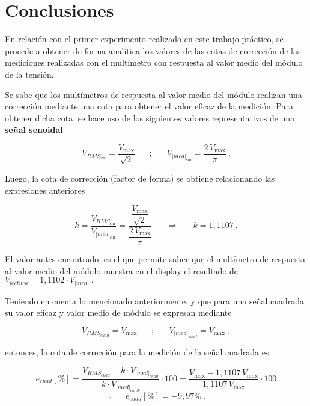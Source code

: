   \pagebreak
  \section{Conclusiones}
    En relación con el primer experimento realizado en este trabajo
    práctico, se procede a obtener de forma analítica los valores
    de las cotas de corrección de las mediciones realizadas con
    el multímetro con respuesta al valor medio del módulo de la 
    tensión.
    
    Se sabe que los multímetros de respuesta al valor medio del
    módulo realizan una corrección mediante una cota para obtener 
    el valor eficaz de la medición. Para obtener dicha cota, se 
    hace uso de los siguientes valores representativos de una 
    \textbf{señal senoidal}

    \vspace{-5pt}
    $$ V_{RMS_{\sin}} = \dfrac{V_{\max}}{\sqrt{2}} \hspace{20pt} ; 
    \hspace{20pt} V_{|med|_{\sin}} = \dfrac{2\, V_{\max}}{\pi}~. $$

    \noindent Luego, la cota de corrección (factor de forma) se obtiene
    relacionando las expresiones anteriores
    
    \vspace{-5pt}
     $$ k = \dfrac{V_{RMS_{\sin}}}{V_{|med|_{\sin}}} 
        = \dfrac{\dfrac{V_{\max}}{\sqrt{2}}}{\dfrac{2\, V_{\max}}{\pi}}
        \hspace{20pt} \Longrightarrow \hspace{20pt} k = 1,1107~.$$

    El valor antes encontrado, es el que permite saber que el multímetro
    de respuesta al valor medio del módulo muestra en el display el 
    resultado de $ V_{lectura} = 1,1102 \cdot V_{|med|}~. $

    Teniendo en cuenta lo mencionado anteriormente, y que para una señal cuadrada
    su valor eficaz y valor medio de módulo se expresan mediante

    \vspace{-5pt}
    $$ V_{RMS_{cuad}} = V_{\max} \hspace{20pt} ; \hspace{20pt} V_{|med|_{cuad}} = V_{\max}~, $$

    \noindent entonces, la cota de corrección para la medición de 
    la señal cuadrada es

    \vspace{-5pt}
    $$ e_{cuad} [\%] = \dfrac{V_{RMS_{cuad}} - k\cdot V_{|med|_{cuad}}}{k \cdot V_{|med|_{cuad}}} \cdot 100
              = \dfrac{V_{\max} - 1,1107\, V_{\max}}{1,1107\, V_{\max}} \cdot 100 $$
              $$  \therefore \hspace{20pt} \boxed{e_{cuad}[\%] = -9,97\%}~.
    $$


